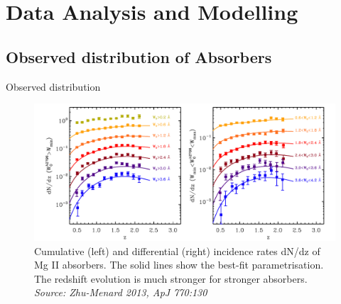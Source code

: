\documentclass{beamer}
\begin{document}
\section{Data Analysis and Modelling}
	\subsection{Observed distribution of Absorbers}
		\begin{frame}{Observed distribution}
			\begin{figure}
				\includegraphics[width=\textwidth]{obs-distrib.png}
				\caption{\tiny  Cumulative (left) and differential (right) incidence rates dN/dz of Mg II absorbers. The solid lines show the best-fit parametrisation. The	redshift evolution is much stronger for stronger absorbers. \emph{Source: Zhu-Menard 2013, ApJ 770:130}}
				\label{fig:Zhu-Men13}
			\end{figure}
		\end{frame}
\end{document}

